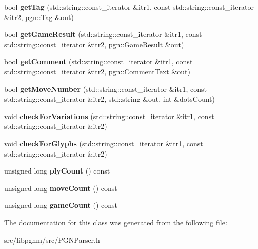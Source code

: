 \begin{DoxyCompactItemize}
\item 
\hypertarget{classpgn_1_1Parser_a23827a2f017d8e43224ee54e1a34c80a}{
bool {\bfseries getTag} (std::string::const\_\-iterator \&itr1, const std::string::const\_\-iterator \&itr2, \hyperlink{classpgn_1_1Tag}{pgn::Tag} \&out)}
\label{classpgn_1_1Parser_a23827a2f017d8e43224ee54e1a34c80a}

\item 
\hypertarget{classpgn_1_1Parser_a238aecf9549d399e87fb493cbd75c287}{
bool {\bfseries getGameResult} (std::string::const\_\-iterator \&itr1, const std::string::const\_\-iterator \&itr2, \hyperlink{classpgn_1_1GameResult}{pgn::GameResult} \&out)}
\label{classpgn_1_1Parser_a238aecf9549d399e87fb493cbd75c287}

\item 
\hypertarget{classpgn_1_1Parser_a44908441a9a67bd63c600d229bfa25ed}{
bool {\bfseries getComment} (std::string::const\_\-iterator \&itr1, const std::string::const\_\-iterator \&itr2, \hyperlink{classpgn_1_1CommentText}{pgn::CommentText} \&out)}
\label{classpgn_1_1Parser_a44908441a9a67bd63c600d229bfa25ed}

\item 
\hypertarget{classpgn_1_1Parser_a30c8b1a37f599a4bd4bdc68e88f6434d}{
bool {\bfseries getMoveNumber} (std::string::const\_\-iterator \&itr1, const std::string::const\_\-iterator \&itr2, std::string \&out, int \&dotsCount)}
\label{classpgn_1_1Parser_a30c8b1a37f599a4bd4bdc68e88f6434d}

\item 
\hypertarget{classpgn_1_1Parser_a4ca0f53a4c04ecd358829c3c34bd23a9}{
void {\bfseries checkForVariations} (std::string::const\_\-iterator \&itr1, const std::string::const\_\-iterator \&itr2)}
\label{classpgn_1_1Parser_a4ca0f53a4c04ecd358829c3c34bd23a9}

\item 
\hypertarget{classpgn_1_1Parser_a8fcac145c61f86f50195408ad1d2444b}{
void {\bfseries checkForGlyphs} (std::string::const\_\-iterator \&itr1, const std::string::const\_\-iterator \&itr2)}
\label{classpgn_1_1Parser_a8fcac145c61f86f50195408ad1d2444b}

\item 
\hypertarget{classpgn_1_1Parser_a8ee3a4afd1a21ce8d55e9c371771d140}{
unsigned long {\bfseries plyCount} () const }
\label{classpgn_1_1Parser_a8ee3a4afd1a21ce8d55e9c371771d140}

\item 
\hypertarget{classpgn_1_1Parser_a1bab37b921a1ed91a90e0fe88f4e5ca7}{
unsigned long {\bfseries moveCount} () const }
\label{classpgn_1_1Parser_a1bab37b921a1ed91a90e0fe88f4e5ca7}

\item 
\hypertarget{classpgn_1_1Parser_a3492dcc7dd6462f3b3779dd1276d0c31}{
unsigned long {\bfseries gameCount} () const }
\label{classpgn_1_1Parser_a3492dcc7dd6462f3b3779dd1276d0c31}

\end{DoxyCompactItemize}


The documentation for this class was generated from the following file:\begin{DoxyCompactItemize}
\item 
src/libpgnm/src/PGNParser.h\end{DoxyCompactItemize}
